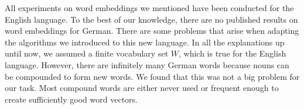 \documentclass{amsart}
\theoremstyle{plain}
\theoremstyle{definition}
\begin{document}
All experiments on word embeddings we mentioned have been conducted for the English language.
To the best of our knowledge, there are no published results on word embeddings for German.
There are some problems that arise when adapting the algorithms we introduced to this new language.
In all the explanations up until now, we assumed a finite vocabulary set $W$, which is true for the English language.
However, there are infinitely many German words because nouns can be compounded to form new words.
We found that this was not a big problem for our task.
Most compound words are either never used or frequent enough to create sufficiently good word vectors.

\printbibliography
\end{document}
